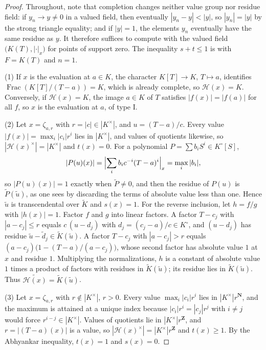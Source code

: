 \begin{proof}
Throughout, note that completion changes neither value group nor
residue field: if $y_n\to y\neq0$ in a valued field, then eventually
$|y_n-y|<|y|$, so $|y_n|=|y|$ by the strong triangle equality; and
if $|y|=1$, the elements $y_n$ eventually have the same residue as
$y$.  It therefore suffices to compute with the valued field
$\bigl(K(T),|\cdot|_x\bigr)$ for points of support zero.  The
inequality $s+t\leq1$ is  with
$F=K(T)$ and $n=1$.

(1) If $x$ is the evaluation at $a\in K$, the character
$K[T]\to K$, $T\mapsto a$, identifies
$\operatorname{Frac}(K[T]/(T-a))=K$, which is already complete, so
$\mathcal H(x)=K$.  Conversely, if $\mathcal H(x)=K$, the image
$a\in K$ of $T$ satisfies $|f(x)|=|f(a)|$ for all $f$, so
$x$ is the evaluation at $a$, of type I.

(2) Let $x=\zeta_{a,r}$ with $r=|c|\in|K^\times|$, and
$u=(T-a)/c$.  Every value
$|f(x)|=\max_i|c_i|r^i$ lies in $|K^\times|$, and values of
quotients likewise, so $|\mathcal H(x)^\times|=|K^\times|$ and
$t(x)=0$.  For a polynomial $P=\sum b_iS^i\in K^\circ[S]$,
\[
 |P(u)(x)|=\Bigl|\sum_ib_ic^{-i}(T-a)^i\Bigr|_x=\max_i|b_i|,
\]
so $|P(u)(x)|=1$ exactly when $\widetilde P\neq0$, and then the
residue of $P(u)$ is $\widetilde P(\tilde u)$, as one sees by
discarding the terms of absolute value less than one.  Hence
$\tilde u$ is transcendental over $\widetilde K$ and $s(x)=1$.
For the reverse inclusion, let $h=f/g$ with $|h(x)|=1$.  Factor
$f$ and $g$ into linear factors.  A factor $T-c_j$ with
$|a-c_j|\leq r$ equals $c\,(u-d_j)$ with
$d_j=(c_j-a)/c\in K^\circ$, and $(u-d_j)$ has residue
$\tilde u-\tilde d_j\in\widetilde K(\tilde u)$.  A factor $T-c_j$
with $|a-c_j|>r$ equals
$(a-c_j)\bigl(1-(T-a)/(a-c_j)\bigr)$, whose second factor has
absolute value $1$ at $x$ and residue $1$.  Multiplying the
normalizations, $h$ is a constant of absolute value $1$ times a
product of factors with residues in $\widetilde K(\tilde u)$; its
residue lies in $\widetilde K(\tilde u)$.  Thus
$\widetilde{\mathcal H(x)}=\widetilde K(\tilde u)$.

(3) Let $x=\zeta_{a,r}$ with $r\notin|K^\times|$, $r>0$.  Every
value $\max_i|c_i|r^i$ lies in $|K^\times|r^{\mathbf N}$, and the
maximum is attained at a unique index because
$|c_i|r^i=|c_j|r^j$ with $i\neq j$ would force
$r^{i-j}\in|K^\times|$.  Values of quotients lie in
$|K^\times|r^{\mathbf Z}$, and $r=|(T-a)(x)|$ is a value, so
$|\mathcal H(x)^\times|=|K^\times|r^{\mathbf Z}$ and
$t(x)\geq1$.  By the Abhyankar inequality, $t(x)=1$ and
$s(x)=0$.


\end{proof}
